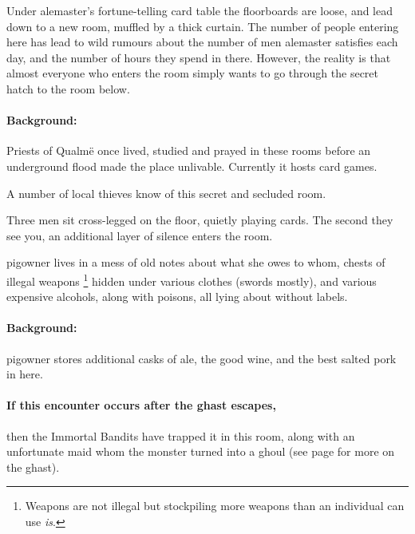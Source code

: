 \begin{multicols}{2}
\begin{boxtext}
\end{boxtext}

Under \gls{alemaster}'s fortune-telling card table the floorboards are loose, and lead down to a new room, muffled by a thick curtain.
The number of people entering here has lead to wild rumours about the number of men \gls{alemaster} satisfies each day, and the number of hours they spend in there.
However, the reality is that almost everyone who enters the room simply wants to go through the secret hatch to the room below.

\alemaster

\label{pigDen}

\paragraph{Background:}
Priests of Qualm\"{e} once lived, studied and prayed in these rooms before an underground flood made the place unlivable.
Currently it hosts card games.

A number of local thieves know of this secret and secluded room.

\begin{boxtext}
  Three men sit cross-legged on the floor, quietly playing cards.
  The second they see you, an additional layer of silence enters the room.
\end{boxtext}


\label{pigRoom}

\Gls{pigowner} lives in a mess of old notes about what she owes to whom, chests of illegal weapons%
\footnote{Weapons are not illegal but stockpiling more weapons than an individual can use \emph{is}.}
hidden under various clothes (swords mostly), and various expensive alcohols, along with poisons, all lying about without labels.

\label{pig_pantry}

\paragraph{Background:}
\Gls{pigowner} stores additional casks of ale, the good wine, and the best salted pork in here.

\paragraph{If this encounter occurs after the ghast escapes,}
then the Immortal Bandits have trapped it in this room, along with an unfortunate maid whom the monster turned into a ghoul (see page \pageref{ghastEscape} for more on the ghast).


\end{multicols}
